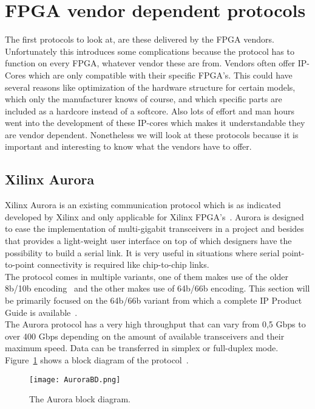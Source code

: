 \section{FPGA vendor dependent protocols}
\label{sec:survey_vendor}
The first protocols to look at, are these delivered by the FPGA vendors. Unfortunately this introduces some complications because the protocol has to function on every FPGA, whatever vendor these are from. Vendors often offer IP-Cores which are only compatible with their specific FPGA's. This could have several reasons like optimization of the hardware structure for certain models, which only the manufacturer knows of course, and which specific parts are included as a hardcore instead of a softcore. Also lots of effort and man hours went into the development of these IP-cores which makes it understandable they are vendor dependent. Nonetheless we will look at these protocols because it is important and interesting to know what the vendors have to offer.

\subsection[Xilinx Aurora]{Xilinx Aurora}
Xilinx Aurora is an existing communication protocol which is as indicated developed by Xilinx and only applicable for Xilinx FPGA's~\cite{Aurora_64B66B_MainPage}. Aurora is designed to ease the implementation of multi-gigabit transceivers in a project and besides that provides a light-weight user interface on top of which designers have the possibility to build a serial link. It is very useful in situations where serial point-to-point connectivity is required like chip-to-chip links.\\
The protocol comes in multiple variants, one of them makes use of the older 8b/10b encoding~\cite{Aurora_8B10B_MainPage} and the other makes use of 64b/66b encoding. This section will be primarily focused on the 64b/66b variant from which a complete IP Product Guide is available~\cite{Aurora_64B66B_IpCore}.\\

The Aurora protocol has a very high throughput that can vary from 0,5 Gbps to over 400 Gbps depending on the amount of available transceivers and their maximum speed. Data can be transferred in simplex or full-duplex mode. Figure~\ref{fig:Aurora_BlockDiagram} shows a block diagram of the protocol~\cite{Aurora_64B66B_IpCore}.
\begin{figure}[ht]
	\centering
	\texttt{[image: AuroraBD.png]}	
	\caption{The Aurora block diagram.}
	\label{fig:Aurora_BlockDiagram}
\end{figure} 

